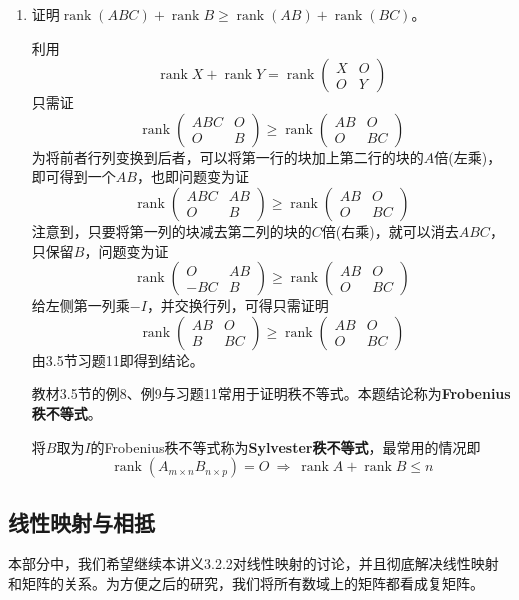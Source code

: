 \documentclass[a4paper,UTF8,fontset=windows]{ctexart}
\DeclareMathOperator{\rank}{rank}
\newcommand*{\note}{\noindent *}
\begin{document}
\begin{enumerate}
    \item 证明$\rank(ABC)+\rank B\ge\rank(AB)+\rank(BC)$。
    
    利用
    $$\rank X+\rank Y=\rank\begin{pmatrix}X&O\\O&Y\end{pmatrix}$$
    只需证
    $$\rank\begin{pmatrix}ABC&O\\O&B\end{pmatrix}\ge\rank\begin{pmatrix}AB&O\\O&BC\end{pmatrix}$$
    为将前者行列变换到后者，可以将第一行的块加上第二行的块的$A$倍(左乘)，即可得到一个$AB$，也即问题变为证
    $$\rank\begin{pmatrix}ABC&AB\\O&B\end{pmatrix}\ge\rank\begin{pmatrix}AB&O\\O&BC\end{pmatrix}$$
    注意到，只要将第一列的块减去第二列的块的$C$倍(右乘)，就可以消去$ABC$，只保留$B$，问题变为证
    $$\rank\begin{pmatrix}O&AB\\-BC&B\end{pmatrix}\ge\rank\begin{pmatrix}AB&O\\O&BC\end{pmatrix}$$
    给左侧第一列乘$-I$，并交换行列，可得只需证明
    $$\rank\begin{pmatrix}AB&O\\B&BC\end{pmatrix}\ge\rank\begin{pmatrix}AB&O\\O&BC\end{pmatrix}$$
    由3.5节习题11即得到结论。

    \note 教材3.5节的例8、例9与习题11常用于证明秩不等式。本题结论称为\textbf{Frobenius秩不等式}。

    \note 将$B$取为$I$的Frobenius秩不等式称为\textbf{Sylvester秩不等式}，最常用的情况即
    $$\rank(A_{m\times n}B_{n\times p})=O\ \Longrightarrow\ \rank A+\rank B\le n$$
\end{enumerate}

\subsection{线性映射与相抵}
本部分中，我们希望继续本讲义3.2.2对线性映射的讨论，并且彻底解决线性映射和矩阵的关系。为方便之后的研究，我们将所有数域上的矩阵都看成复矩阵。
\end{document}

